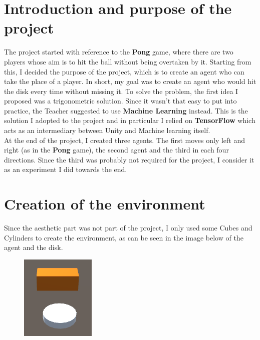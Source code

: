 \documentclass[12pt]{article}
\begin{document}
\begin{titlepage}
		
		\vfill 
		
	\end{titlepage}

	\tableofcontents
	
	\newpage
	
	\section{Introduction and purpose of the project}
	The project started with reference to the \textbf{Pong} game, where there are two players whose aim is to hit the ball without being overtaken by it. Starting from this, I decided the purpose of the project, which is to create an agent who can take the place of a player. In short, my goal was to create an agent who would hit the disk every time without missing it.
	To solve the problem, the first idea I proposed was a trigonometric solution. Since it wasn't that easy to put into practice, the Teacher suggested to use \textbf{Machine Learning} instead. This is the solution I adopted to the project and in particular I relied on \textbf{TensorFlow} which acts as an intermediary between Unity and Machine learning itself.\\
	At the end of the project, I created three agents. The first moves only left and right (as in the \textbf{Pong} game), the second agent and the third in each four directions. Since the third was probably not required for the project, I consider it as an experiment I did towards the end.
	
	\newpage
	
	\section{Creation of the environment}
	Since the aesthetic part was not part of the project, I only used some Cubes and Cylinders to create the environment, as can be seen in the image below of the agent and the disk.
	
	\begin{figure}[hbt!]
		\centering
		\includegraphics[width= 0.3
		\textwidth]{images/Disk&Agent}
	\end{figure} 
\end{document}
